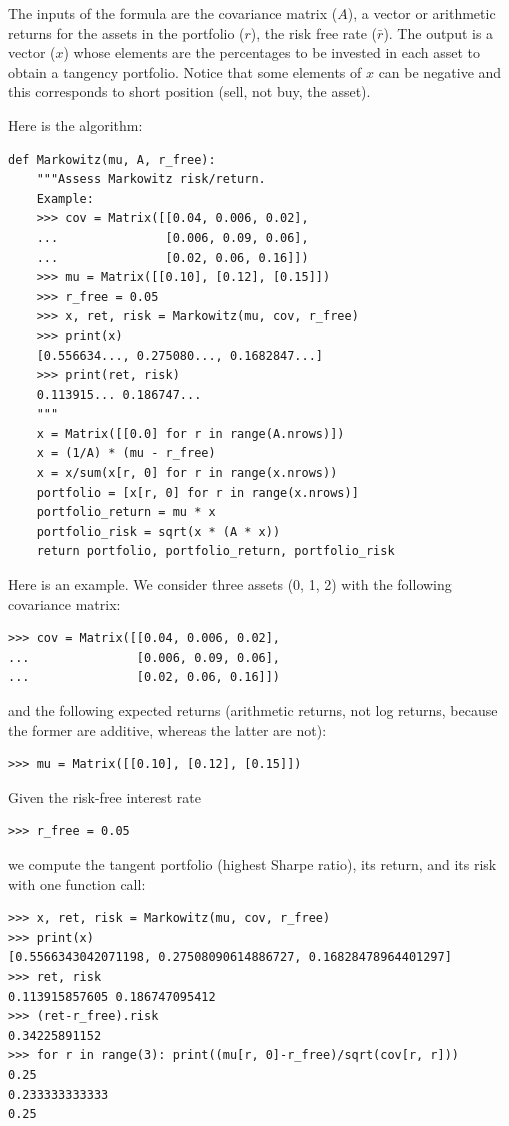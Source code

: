 \documentclass[justified, sixbynine]{tufte-book}
\def\ft{\small\tt}
\theoremstyle{plain}%
\newtheorem * {corollary}{Corollary}
\theoremstyle{definition}
\theoremstyle{remark}
\newtheorem * {remark}{Remark}
\newtheorem * {note}{Note}
\begin{document}
\begin{fullwidth}
The inputs of the formula are the covariance matrix ($A$), a vector or arithmetic returns for the assets in the portfolio ($r$), the risk free rate ($\bar{r}$). The output is a vector ($x$) whose elements are the percentages to be invested in each asset to obtain a tangency portfolio. Notice that some elements of $x$ can be negative and this corresponds to short position (sell, not buy, the asset).

Here is the algorithm:

\begin{lstlisting}[caption={in file: {\ft nlib.py}}]
def Markowitz(mu, A, r_free):
    """Assess Markowitz risk/return.
    Example:
    >>> cov = Matrix([[0.04, 0.006, 0.02], 
    ...               [0.006, 0.09, 0.06], 
    ...               [0.02, 0.06, 0.16]])
    >>> mu = Matrix([[0.10], [0.12], [0.15]])
    >>> r_free = 0.05
    >>> x, ret, risk = Markowitz(mu, cov, r_free)
    >>> print(x)
    [0.556634..., 0.275080..., 0.1682847...]
    >>> print(ret, risk)
    0.113915... 0.186747...
    """
    x = Matrix([[0.0] for r in range(A.nrows)])
    x = (1/A) * (mu - r_free)
    x = x/sum(x[r, 0] for r in range(x.nrows))
    portfolio = [x[r, 0] for r in range(x.nrows)]
    portfolio_return = mu * x
    portfolio_risk = sqrt(x * (A * x))
    return portfolio, portfolio_return, portfolio_risk
\end{lstlisting}

Here is an example.
We consider three assets (0, 1, 2) with the following covariance matrix:
\begin{lstlisting}
>>> cov = Matrix([[0.04, 0.006, 0.02], 
...               [0.006, 0.09, 0.06], 
...               [0.02, 0.06, 0.16]])
\end{lstlisting}
and the following expected returns (arithmetic returns, not log returns, because the former are additive, whereas the latter are not):
\begin{lstlisting}
>>> mu = Matrix([[0.10], [0.12], [0.15]])
\end{lstlisting}
Given the risk-free interest rate
\begin{lstlisting}
>>> r_free = 0.05
\end{lstlisting}
we compute the tangent portfolio (highest Sharpe ratio), its return, and its risk with one function call:
\begin{lstlisting}
>>> x, ret, risk = Markowitz(mu, cov, r_free)
>>> print(x)
[0.5566343042071198, 0.27508090614886727, 0.16828478964401297]
>>> ret, risk
0.113915857605 0.186747095412
>>> (ret-r_free).risk
0.34225891152
>>> for r in range(3): print((mu[r, 0]-r_free)/sqrt(cov[r, r]))
0.25
0.233333333333
0.25
\end{lstlisting}


\end{fullwidth}
\end{document}
